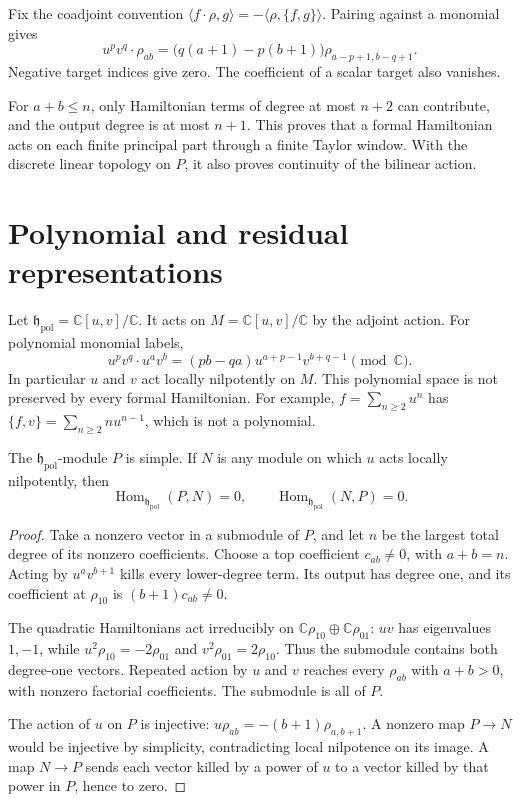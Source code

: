 Fix the coadjoint convention
$\langle f\cdot\rho,g\rangle=-\langle\rho,\{f,g\}\rangle$.
Pairing against a monomial gives
\begin{equation}\label{mht:eq:full-residue-action}
 u^pv^q\cdot\rho_{ab}
   =\bigl(q(a+1)-p(b+1)\bigr)
                    \rho_{a-p+1,b-q+1}.
\end{equation}
Negative target indices give zero. The coefficient of a scalar
target also vanishes.

For $a+b\leq n$, only Hamiltonian terms of
degree at most $n+2$ can contribute, and the output degree is at
most $n+1$. This proves that a formal Hamiltonian acts on each
finite principal part through a finite Taylor window. With the
discrete linear topology on $P$, it also proves continuity of
the bilinear action.

\section{Polynomial and residual representations}

Let $\mathfrak h_{\mathrm{pol}}=\mathbb C[u,v]/\mathbb C$.
It acts on $M=\mathbb C[u,v]/\mathbb C$ by the adjoint action.
For polynomial monomial labels,
\[
 u^pv^q\cdot u^av^b=(pb-qa)u^{a+p-1}v^{b+q-1}
                         \pmod{\mathbb C}.
\]
In particular $u$ and $v$ act locally nilpotently on $M$.
This polynomial space is not preserved by every formal
Hamiltonian. For example, $f=\sum_{n\geq2}u^n$ has
$\{f,v\}=\sum_{n\geq2}n u^{n-1}$, which is not a polynomial.

\begin{theorem}\label{mht:thm:residue-simple}
The $\mathfrak h_{\mathrm{pol}}$-module $P$ is simple. If $N$ is
any module on which $u$ acts locally nilpotently, then
\[
 \operatorname{Hom}_{\mathfrak h_{\mathrm{pol}}}(P,N)=0,
 \qquad
 \operatorname{Hom}_{\mathfrak h_{\mathrm{pol}}}(N,P)=0.
\]
\end{theorem}

\begin{proof}
Take a nonzero vector in a submodule of $P$, and let $n$ be the
largest total degree of its nonzero coefficients. Choose a top
coefficient $c_{ab}\ne0$, with $a+b=n$. Acting by
$u^av^{b+1}$ kills every lower-degree term. Its output has degree
one, and its coefficient at $\rho_{10}$ is $(b+1)c_{ab}\ne0$.

The quadratic Hamiltonians act irreducibly on
$\mathbb C\rho_{10}\oplus\mathbb C\rho_{01}$: $uv$ has
eigenvalues $1,-1$, while $u^2\rho_{10}=-2\rho_{01}$ and
$v^2\rho_{01}=2\rho_{10}$. Thus the submodule contains both
degree-one vectors. Repeated action by $u$ and $v$ reaches
every $\rho_{ab}$ with $a+b>0$, with nonzero factorial
coefficients. The submodule is all of $P$.

The action of $u$ on $P$ is injective:
$u\rho_{ab}=-(b+1)\rho_{a,b+1}$. A nonzero map $P\to N$
would be injective by simplicity, contradicting local nilpotence
on its image. A map $N\to P$ sends each vector killed by a power
of $u$ to a vector killed by that power in $P$, hence to zero.
\end{proof}

